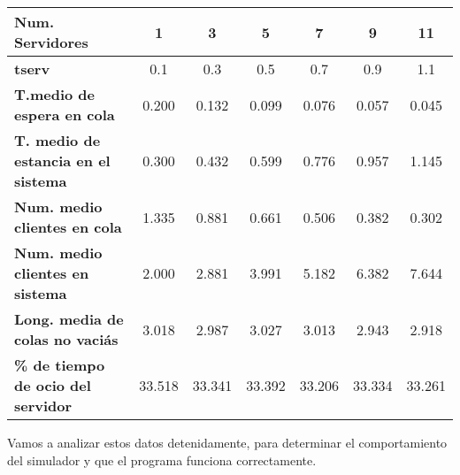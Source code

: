\documentclass[]{article}
\begin{document}
\begin{table}[H]
	\begin{center}
		\begin{tabularx}{1\textwidth}{|X|c|c|c|c|c|c|}
			\hline
			\textbf{Num. Servidores} & 1 & 3 & 5 & 7 & 9 & 11\\
			\hline \hline
			\textbf{tserv} & 0.1 & 0.3 & 0.5 & 0.7 & 0.9 & 1.1\\ \hline
			\textbf{T.medio de espera en cola}& 0.200&0.132 &0.099 &0.076 &0.057 &0.045\\ \hline
			\textbf{T. medio de estancia en el sistema}& 0.300 &0.432 &0.599 &0.776 &0.957 &1.145\\ \hline
			\textbf{Num. medio clientes en cola}& 1.335 &0.881 &0.661 &0.506 &0.382 &0.302\\  \hline
			\textbf{Num. medio clientes en sistema}& 2.000 &2.881 &3.991 &5.182 &6.382 &7.644\\ \hline
			\textbf{Long. media de colas no vaciás}&3.018& 2.987&3.027 &3.013 &2.943 &2.918\\ \hline
			\textbf{\% de tiempo de ocio del servidor}&33.518& 33.341&33.392 &33.206 &33.334 &33.261\\ \hline
		\end{tabularx}
		
	\end{center}
\end{table}
Vamos a analizar estos datos detenidamente, para determinar el comportamiento del simulador y que el programa funciona correctamente.
\end{document}
